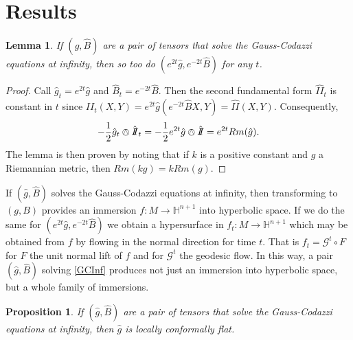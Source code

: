 \documentclass{amsart}
\newcommand{\two}{I\!\!I}
\newtheorem{lem}[thm]{Lemma}
\newtheorem{prop}[thm]{Proposition}
\renewcommand{\H}{\mathbb{H}}
\begin{document}
\section{Results}

\begin{lem}
\label{scalings}
If $(\hat{g},\hat{B})$ are a pair of tensors that solve the Gauss-Codazzi equations at infinity, then so too do $(e^{2t}\hat{g},e^{-2t}\hat{B})$ for any $t$. 
\end{lem}

\begin{proof}
Call $\hat{g}_t = e^{2t}\hat{g}$ and $\hat{B}_t = e^{-2t}\hat{B}$.
Then the second fundamental form $\hat{\two}_t$ is constant in $t$ since $\hat{\two}_t(X,Y) = e^{2t}\hat{g}(e^{-2t}\hat{B}X,Y) = \hat{\two}(X,Y)$.
Consequently, 
\[
-\frac{1}{2}\hat{g}_t \owedge \hat{\two}_t 
= -\frac{1}{2}e^{2t}\hat{g}\owedge \hat{\two} 
= e^{2t}Rm(\hat{g}).
\]
The lemma is then proven by noting that if $k$ is a positive constant and $g$ a Riemannian metric, then $Rm(kg) = kRm(g)$.
\end{proof}

If $(\hat{g},\hat{B})$ solves the Gauss-Codazzi equations at infinity, then transforming to $(g,B)$ provides an immersion $f: M \to \H^{n+1}$ into hyperbolic space.
If we do the same for $(e^{2t}\hat{g},e^{-2t}\hat{B})$ we obtain a hypersurface in $f_t: M \to \H^{n+1}$ which may be obtained from $f$ by flowing in the normal direction for time $t$.
That is $f_t  = \mathcal{G}^t \circ F$ for $F$ the unit normal lift of $f$ and for $\mathcal{G}^t$ the geodesic flow. 
In this way, a pair $(\hat{g},\hat{B})$ solving \ref{GCInf} produces not just an immersion into hyperbolic space, but a whole family of immersions.

\begin{prop}
\label{GCInf-LCF}
If $(\hat{g},\hat{B})$ are a pair of tensors that solve the Gauss-Codazzi equations at infinity, then $\hat{g}$ is locally conformally flat. 
\end{prop}
\end{document}
